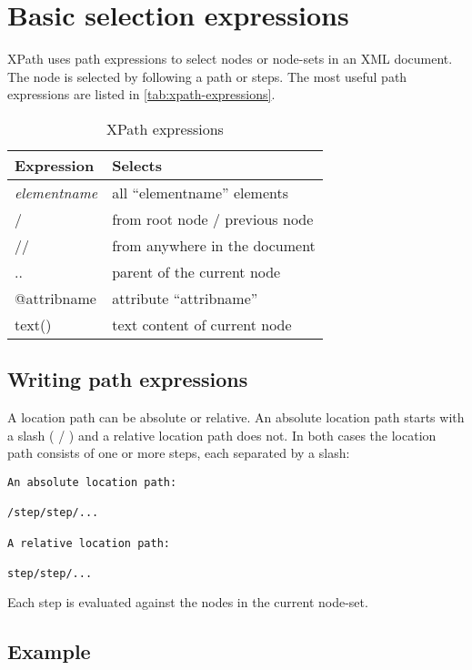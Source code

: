 \documentclass[slides]{pgnotes}
\begin{document}
\section{Basic selection expressions}

XPath uses path expressions to select nodes or node-sets in an XML document.
The node is selected by following a path or steps.
The most useful path expressions are listed in \autoref{tab:xpath-expressions}.

\begin{table}[htbp]
  \centering
  \begin{tabular}{l l}
    \toprule
    \textbf{Expression} & \textbf{Selects} \\
    \midrule
    \textit{elementname} &  all ``elementname'' elements\\
    / & from root node / previous node \\
    // & from anywhere in the document \\
    .. & parent of the current node \\
    @attribname & attribute ``attribname'' \\
    text() & text content of current node\\
    \bottomrule
  \end{tabular}
  \caption{XPath expressions}
  \label{tab:xpath-expressions}
\end{table}

\subsection{Writing path expressions}

A location path can be absolute or relative.
An absolute location path starts with a slash ( / ) and a relative location path does not.
In both cases the location path consists of one or more steps, each separated by a slash:

\begin{verbatim}
An absolute location path:

/step/step/...

A relative location path:

step/step/...
\end{verbatim}

Each step is evaluated against the nodes in the current node-set.


\subsection{Example}
\end{document}

